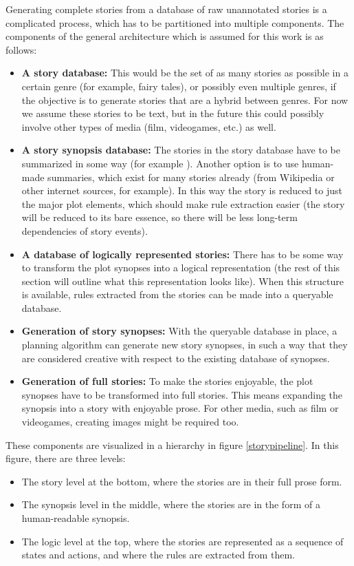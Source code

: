 Generating complete stories from a database of raw unannotated stories is a
complicated process, which has to be partitioned into multiple components.
The components of the general architecture which is assumed for this work is as follows:
\begin{itemize}
\item \textbf{A story database:} This would be the set of as many stories
as possible in a certain genre (for example, fairy tales), or possibly even
multiple genres, if the objective is to generate stories that are a hybrid
between genres. For now we assume these stories to be text, but in the future
this could possibly involve other types of media (film, videogames, etc.) as
well.
\item \textbf{A story synopsis database:} The stories in the story database have 
to be summarized in some way (for example \cite{salton1997automatic}). Another
option is to use human-made summaries, which exist for many stories already
(from Wikipedia or other internet sources, for example). In this way the story
is reduced to just the major plot elements, which should make rule extraction
easier (the story will be reduced to its bare essence, so there will be less 
long-term dependencies of story events).
\item \textbf{A database of logically represented stories:} There has to be some
way to transform the plot synopses into a logical representation (the rest of
this section will outline what this representation looks like). When this
structure is available, rules extracted from the stories can be made into a
queryable database.
\item \textbf{Generation of story synopses:} With the queryable database in place, a
planning algorithm can generate new story synopses, in such a way that they are
considered creative with respect to the existing database of synopses.
\item \textbf{Generation of full stories:} To make the stories enjoyable, the
plot synopses have to be transformed into full stories. This means expanding the
synopsis into a story with enjoyable prose. For other media, such as film or
videogames, creating images might be required too.
\end{itemize}
These components are visualized in a hierarchy in figure \ref{storypipeline}. In
this figure, there are three levels:
\begin{itemize}
\item The story level at the bottom, where the stories are in their full prose form.
\item The synopsis level in the middle, where the stories are in the form of a
human-readable synopsis.
\item The logic level at the top, where the stories are represented as a
sequence of states and actions, and where the rules are extracted from them.
\end{itemize}

